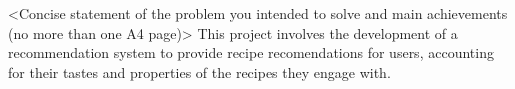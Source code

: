 <Concise statement of the problem you intended to solve and main achievements (no more than one A4 page)>
This project involves the development of a recommendation system to provide recipe recomendations for users, accounting for their
tastes and properties of the recipes they engage with.